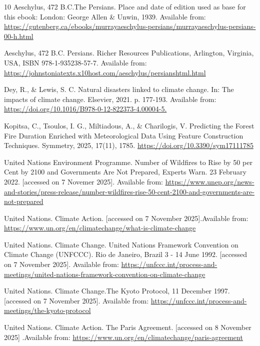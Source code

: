 \documentclass[12pt]{Definitions/academia}
\begin{document}
\begin{thebibliography}{10}
Aeschylus, 472 B.C.The Persians. Place and date
of edition used as base for this ebook: London: George Allen \& Unwin,
1939. Available from: \url{https://gutenberg.ca/ebooks/murrayaeschylus-persians/murrayaeschylus-persians-00-h.html}

Aeschylus, 472 B.C. Persians. Richer Resources
Publications, Arlington, Virginia, USA, ISBN 978-1-935238-57-7. Available
from: \url{https://johnstoniatexts.x10host.com/aeschylus/persianshtml.html}

 Dey, R., \& Lewis, S. C. Natural disasters linked
to climate change. In: The impacts of climate change. Elsevier, 2021.
p. 177-193. Available from: \url{https://doi.org/10.1016/B978-0-12-822373-4.00004-5.}

 Kopitsa, C., Tsoulos, I. G., Miltiadous, A., \&
Charilogis, V. Predicting the Forest Fire Duration Enriched with Meteorological
Data Using Feature Construction Techniques. Symmetry, 2025, 17(11),
1785. \url{https://doi.org/10.3390/sym17111785}

United Nations Environment Programme.
Number of Wildfires to Rise by 50 per Cent by 2100 and Governments
Are Not Prepared, Experts Warn. 23 February 2022. {[}accessed on 7
Novemer 2025{]}. Available from: \url{https://www.unep.org/news-and-stories/press-release/number-wildfires-rise-50-cent-2100-and-governments-are-not-prepared}

 United Nations. Climate Action. {[}accessed
on 7 November 2025{]}.Available from: \url{https://www.un.org/en/climatechange/what-is-climate-change}

 United Nations. Climate Change. United
Nations Framework Convention on Climate Change (UNFCCC). Rio de Janeiro,
Brazil 3 - 14 June 1992. {[}accessed on 7 November 2025{]}. Available
from: \url{https://unfccc.int/process-and-meetings/united-nations-framework-convention-on-climate-change}

 United Nations. Climate Change.The
Kyoto Protocol, 11 December 1997. {[}accessed on 7 November 2025{]}.
Available from: \url{https://unfccc.int/process-and-meetings/the-kyoto-protocol }

United Nations. Climate Action. The
Paris Agreement. {[}accessed on 8 November 2025{]} .Available from:
\url{https://www.un.org/en/climatechange/paris-agreement}


\end{thebibliography}
\end{document}
